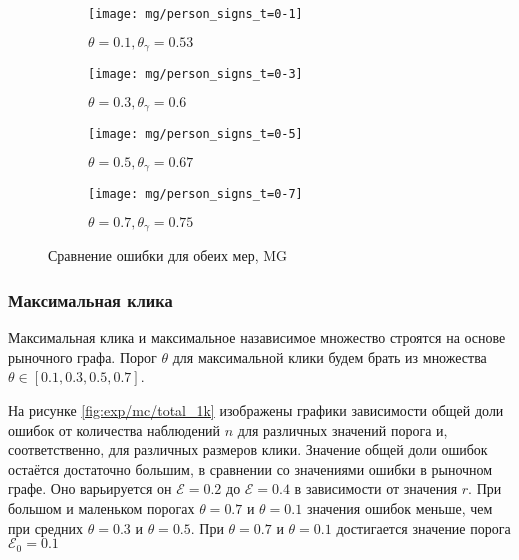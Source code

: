 \begin{figure}[H]
     \centering
     \begin{subfigure}[b]{0.49\textwidth}
         \centering
         \texttt{[image: mg/person\_signs\_t=0-1]}
         \caption{$\theta=0.1, \theta_\gamma=0.53$}
     \end{subfigure}
     \hfill
     \begin{subfigure}[b]{0.49\textwidth}
         \centering
         \texttt{[image: mg/person\_signs\_t=0-3]}
         \caption{$\theta=0.3, \theta_\gamma=0.6$}
     \end{subfigure}
     \vfill
     \begin{subfigure}[b]{0.49\textwidth}
         \centering
         \texttt{[image: mg/person\_signs\_t=0-5]}
         \caption{$\theta=0.5, \theta_\gamma=0.67$}
     \end{subfigure}
     \hfill
     \begin{subfigure}[b]{0.49\textwidth}
         \centering
         \texttt{[image: mg/person\_signs\_t=0-7]}
         \caption{$\theta=0.7,\theta_\gamma=0.75$}
     \end{subfigure}
     

        \caption{Сравнение ошибки для обеих мер, MG}
        \label{fig:exp/mg/pearson_signs}
\end{figure}  


\subsubsection{Максимальная клика}
Максимальная клика и максимальное назависимое множество строятся на основе рыночного графа.  Порог $\theta$ для максимальной клики будем брать из множества $\theta \in [0.1, 0.3, 0.5, 0.7]$.

На рисунке \ref{fig:exp/mc/total_1k} изображены графики зависимости общей доли ошибок от количества наблюдений $n$ для различных значений порога и, соответственно, для различных размеров клики.  Значение  общей доли ошибок остаётся достаточно большим, в сравнении со значениями ошибки в рыночном графе. Оно варьируется он $\mathcal{E}=0.2$ до  $\mathcal{E}=0.4$ в зависимости от значения $r$. При большом и маленьком порогах $\theta=0.7$ и $\theta=0.1$ значения ошибок меньше, чем при средних $\theta=0.3$ и $\theta=0.5$. При $\theta=0.7$ и $\theta=0.1$ достигается значение порога $\mathcal{E}_0=0.1$


